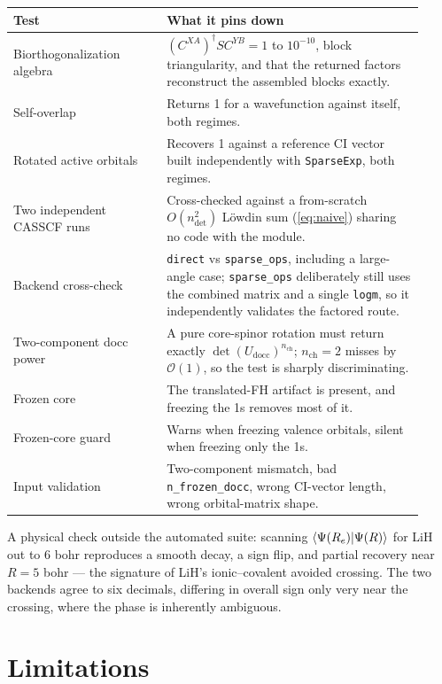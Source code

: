 \documentclass[aip,jcp,preprint]{revtex4-1}
\begin{document}
\begin{center}
\begin{tabular}{@{}p{0.34\linewidth}p{0.58\linewidth}@{}}
\toprule
Test & What it pins down \\
\midrule
Biorthogonalization algebra & $(C^{XA})^\dagger S C^{YB}=1$ to $10^{-10}$,
block triangularity, and that the returned factors reconstruct the assembled
blocks exactly. \\
Self-overlap & Returns 1 for a wavefunction against itself, both regimes. \\
Rotated active orbitals & Recovers 1 against a reference CI vector built
independently with \texttt{SparseExp}, both regimes. \\
Two independent CASSCF runs & Cross-checked against a from-scratch
$O(n_{\det}^2)$ L\"owdin sum (\cref{eq:naive}) sharing no code with the
module. \\
Backend cross-check & \texttt{direct} vs \texttt{sparse\_ops}, including a
large-angle case; \texttt{sparse\_ops} deliberately still uses the combined
matrix and a single \texttt{logm}, so it independently validates the factored
route. \\
Two-component docc power & A pure core-spinor rotation must return exactly
$\det(U_\mathrm{docc})^{n_\mathrm{ch}}$; $n_\mathrm{ch}=2$ misses by
$\mathcal{O}(1)$, so the test is sharply discriminating. \\
Frozen core & The translated-FH artifact is present, and freezing the 1s
removes most of it. \\
Frozen-core guard & Warns when freezing valence orbitals, silent when freezing
only the 1s. \\
Input validation & Two-component mismatch, bad \texttt{n\_frozen\_docc},
wrong CI-vector length, wrong orbital-matrix shape. \\
\bottomrule
\end{tabular}
\end{center}

A physical check outside the automated suite: scanning
$\braket{\Psi(R_e)|\Psi(R)}$ for LiH out to 6 bohr reproduces a smooth decay,
a sign flip, and partial recovery near $R=5$ bohr --- the signature of LiH's
ionic--covalent avoided crossing. The two backends agree to six decimals,
differing in overall sign only very near the crossing, where the phase is
inherently ambiguous.

\section{Limitations}
\end{document}

